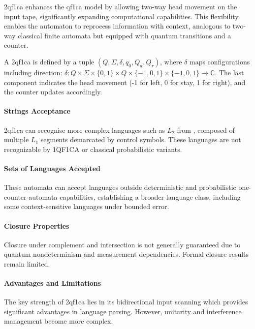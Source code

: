 \gls{2qf1ca} enhances the \gls{qf1ca} model by allowing two-way head movement on the input tape, significantly expanding computational capabilities. This flexibility enables the automaton to reprocess information with context, analogous to two-way classical finite automata but equipped with quantum transitions and a counter.

\begin{definition}[\gls{2qf1ca}]
A \gls{2qf1ca} is defined by a tuple $(Q, \Sigma, \delta, q_0, Q_a, Q_r)$, where $\delta$ maps configurations including direction: $\delta: Q \times \Sigma \times \{0,1\} \times Q \times \{-1,0,1\} \times \{-1,0,1\} \rightarrow \mathbb{C}$. The last component indicates the head movement (-1 for left, 0 for stay, 1 for right), and the counter updates accordingly.
\end{definition}

\paragraph{Strings Acceptance}
\gls{2qf1ca} can recognise more complex languages such as $L_2$ from \cite{bonner2001quantum}, composed of multiple $L_1$ segments demarcated by control symbols. These languages are not recognizable by 1QF1CA or classical probabilistic variants.

\paragraph{Sets of Languages Accepted}
These automata can accept languages outside deterministic and probabilistic one-counter automata capabilities, establishing a broader language class, including some context-sensitive languages under bounded error.

\paragraph{Closure Properties}
Closure under complement and intersection is not generally guaranteed due to quantum nondeterminism and measurement dependencies. Formal closure results remain limited.

\paragraph{Advantages and Limitations}
The key strength of \gls{2qf1ca} lies in its bidirectional input scanning which provides significant advantages in language parsing. However, unitarity and interference management become more complex.

